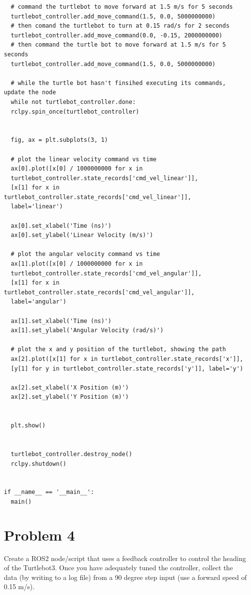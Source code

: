 \documentclass{article}
\begin{document}
\begin{verbatim}
  # command the turtlebot to move forward at 1.5 m/s for 5 seconds
  turtlebot_controller.add_move_command(1.5, 0.0, 5000000000)
  # then comand the turtlebot to turn at 0.15 rad/s for 2 seconds
  turtlebot_controller.add_move_command(0.0, -0.15, 2000000000)
  # then command the turtle bot to move forward at 1.5 m/s for 5 seconds
  turtlebot_controller.add_move_command(1.5, 0.0, 5000000000)

  # while the turtle bot hasn't finsihed executing its commands, update the node
  while not turtlebot_controller.done:
  rclpy.spin_once(turtlebot_controller)
  
  
  fig, ax = plt.subplots(3, 1)

  # plot the linear velocity command vs time
  ax[0].plot([x[0] / 1000000000 for x in
  turtlebot_controller.state_records['cmd_vel_linear']], 
  [x[1] for x in turtlebot_controller.state_records['cmd_vel_linear']],
  label='linear')

  ax[0].set_xlabel('Time (ns)')
  ax[0].set_ylabel('Linear Velocity (m/s)')

  # plot the angular velocity command vs time
  ax[1].plot([x[0] / 1000000000 for x in 
  turtlebot_controller.state_records['cmd_vel_angular']],
  [x[1] for x in turtlebot_controller.state_records['cmd_vel_angular']],
  label='angular')

  ax[1].set_xlabel('Time (ns)')
  ax[1].set_ylabel('Angular Velocity (rad/s)')

  # plot the x and y position of the turtlebot, showing the path
  ax[2].plot([x[1] for x in turtlebot_controller.state_records['x']], 
  [y[1] for y in turtlebot_controller.state_records['y']], label='y')
  
  ax[2].set_xlabel('X Position (m)')
  ax[2].set_ylabel('Y Position (m)')
  

  plt.show()
  

  turtlebot_controller.destroy_node()
  rclpy.shutdown()


if __name__ == '__main__':
  main()

\end{verbatim}

\section*{Problem 4}
Create a ROS2 node/script that uses a feedback controller to control the heading of the Turtlebot3. 
Once you have adequately tuned the controller, collect the data (by writing to a log file) from a 90 
degree step input (use a forward speed of 0.15 m/s).
\end{document}
